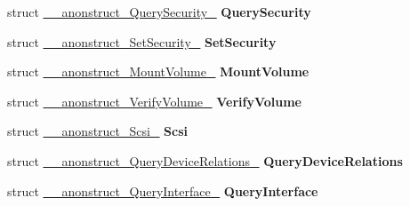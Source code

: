 \begin{DoxyCompactItemize}
\item 
\hypertarget{union____anonunion__Parameters__55_a31acea51a306dff850e04c35f6e047c9}{}struct \hyperlink{struct____anonstruct__QuerySecurity__65}{\+\_\+\+\_\+anonstruct\+\_\+\+Query\+Security\+\_} {\bfseries Query\+Security}\label{union____anonunion__Parameters__55_a31acea51a306dff850e04c35f6e047c9}

\item 
\hypertarget{union____anonunion__Parameters__55_a46e6a9a0f1e9ce3c44504acff50b57df}{}struct \hyperlink{struct____anonstruct__SetSecurity__66}{\+\_\+\+\_\+anonstruct\+\_\+\+Set\+Security\+\_} {\bfseries Set\+Security}\label{union____anonunion__Parameters__55_a46e6a9a0f1e9ce3c44504acff50b57df}

\item 
\hypertarget{union____anonunion__Parameters__55_a80036c3ebd7bf1093fe425a7948ba60c}{}struct \hyperlink{struct____anonstruct__MountVolume__67}{\+\_\+\+\_\+anonstruct\+\_\+\+Mount\+Volume\+\_} {\bfseries Mount\+Volume}\label{union____anonunion__Parameters__55_a80036c3ebd7bf1093fe425a7948ba60c}

\item 
\hypertarget{union____anonunion__Parameters__55_af80ce16f77cfc4d0c69ba43b78544a5c}{}struct \hyperlink{struct____anonstruct__VerifyVolume__68}{\+\_\+\+\_\+anonstruct\+\_\+\+Verify\+Volume\+\_} {\bfseries Verify\+Volume}\label{union____anonunion__Parameters__55_af80ce16f77cfc4d0c69ba43b78544a5c}

\item 
\hypertarget{union____anonunion__Parameters__55_a74a1bd1ad9b37b67c350faae83c341cf}{}struct \hyperlink{struct____anonstruct__Scsi__69}{\+\_\+\+\_\+anonstruct\+\_\+\+Scsi\+\_} {\bfseries Scsi}\label{union____anonunion__Parameters__55_a74a1bd1ad9b37b67c350faae83c341cf}

\item 
\hypertarget{union____anonunion__Parameters__55_a9f1de5e3379bcef9a7ea9381c906f5ac}{}struct \hyperlink{struct____anonstruct__QueryDeviceRelations__70}{\+\_\+\+\_\+anonstruct\+\_\+\+Query\+Device\+Relations\+\_} {\bfseries Query\+Device\+Relations}\label{union____anonunion__Parameters__55_a9f1de5e3379bcef9a7ea9381c906f5ac}

\item 
\hypertarget{union____anonunion__Parameters__55_a9ff55c7cf5ee7877a62c26a722a22c21}{}struct \hyperlink{struct____anonstruct__QueryInterface__71}{\+\_\+\+\_\+anonstruct\+\_\+\+Query\+Interface\+\_} {\bfseries Query\+Interface}\label{union____anonunion__Parameters__55_a9ff55c7cf5ee7877a62c26a722a22c21}


\end{DoxyCompactItemize}

